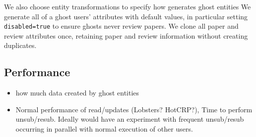 
We also choose entity transformations to specify how \sys generates ghost entities 
We generate all of a ghost users' attributes with default values, in particular setting \texttt{disabled=true} to ensure ghosts never review papers. We clone all paper and review attributes once, retaining paper and review information without creating duplicates. 


\subsection{\sys Performance}
\label{sec:perf}
\begin{itemize}
    \item how much data created by ghost entities
    \item Normal performance of read/updates (Lobsters? HotCRP?), Time to perform unsub/resub.
        Ideally would have an experiment with frequent unsub/resub occurring in parallel with normal execution
        of other users.
\end{itemize}

